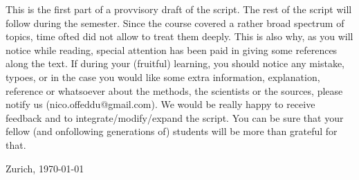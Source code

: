 






This is the first part of a provvisory draft of the script. The rest of the script will follow during the semester. Since the course covered a rather broad spectrum of topics, time ofted did not allow to treat them deeply. This is also why, as you will notice while reading, special attention has been paid in giving some references along the text. If during your (fruitful) learning, you should notice any mistake, typoes, or in the case you would like some extra information, explanation, reference or whatsoever about the methods, the scientists or the sources, please notify us (nico.offeddu@gmail.com). We would be really happy to receive feedback and to integrate/modify/expand the script. You can be sure that your fellow (and onfollowing generations of) students will be more than grateful for that.
\vspace{2cm}

Zurich,
\today{}

\vfill


\begin{comment}
for the lecture \emph{Computational Statistical Physics} held at ETHZ during the spring semester 2014 by Prof. H.J. Herrmann.
\end{comment}
